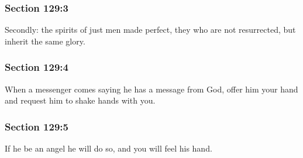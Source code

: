 	\subsubsection{Section 129:3} %
		\label{DC129-3}

		Secondly: the spirits of just men made perfect, they who are not resurrected, but inherit the same glory.


	\subsubsection{Section 129:4} %
		\label{DC129-4}

		When a messenger comes saying he has a message from God, offer him your hand and request him to shake hands with you.


	\subsubsection{Section 129:5} %
		\label{DC129-5}

		If he be an angel he will do so, and you will feel his hand.


